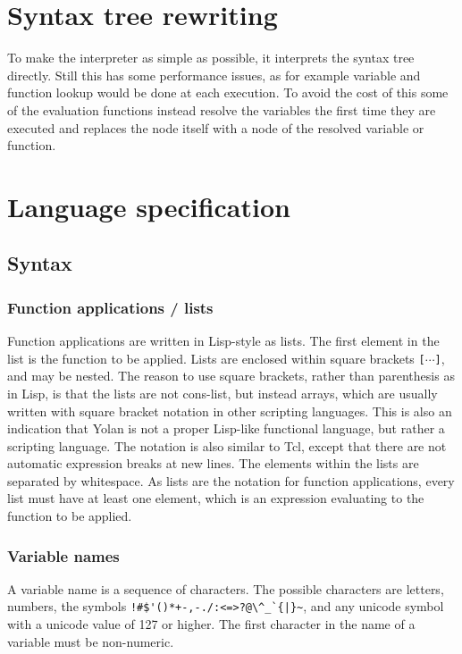 \documentclass[11pt]{report}
\begin{document}
\section{Syntax tree rewriting}

To make the interpreter as simple as possible, it interprets the syntax tree directly. Still this has some performance issues, as for example variable and function lookup would be done at each execution. To avoid the cost of this some of the evaluation functions instead resolve the variables the first time they are executed and replaces the node itself with a node of the resolved variable or function.

\section{Language specification}

\subsection{Syntax}
\subsubsection{Function applications / lists}
Function applications are written in Lisp-style as lists. The first element in the list is the function to be applied.
Lists are enclosed within square brackets \verb|[|$\cdots$\verb|]|, and may be nested. 
The reason to use square brackets, rather than parenthesis as in Lisp, is that the lists are not cons-list, but instead arrays, which are usually written with square bracket notation in other scripting languages. This is also an indication that Yolan is not a proper Lisp-like functional language, but rather a scripting language. The notation is also similar to Tcl, except that there are not automatic expression breaks at new lines.
The elements within the lists are separated by whitespace. 
As lists are the notation for function applications, every list must have at least one element, which is an expression evaluating to the function to be applied.

\subsubsection{Variable names}
A variable name is a sequence of characters. The possible characters are letters, numbers, the symbols \verb"!#$'()*+-,-./:<=>?@\^_`{|}~", and any unicode symbol with a unicode value of 127 or higher. The first character in the name of a variable must be non-numeric.
\end{document}
